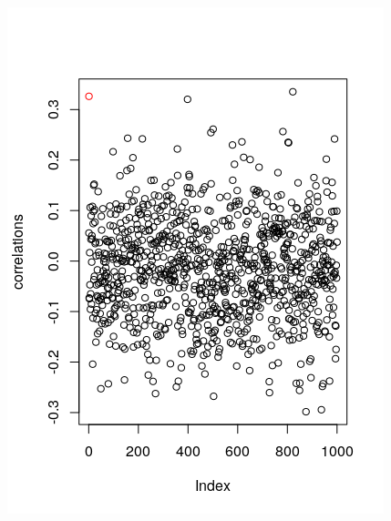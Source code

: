 \documentclass[12pt]{article}
\begin{document}
        \includegraphics{./Correlates/}
\end{document}
